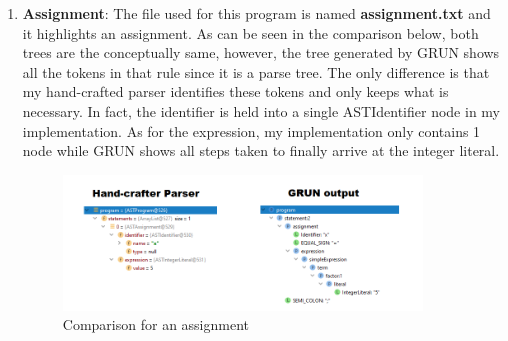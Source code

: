 \documentclass{article}
\begin{document}
\begin{enumerate}
					\item \textbf{Assignment}: The file used for this program is named \textbf{assignment.txt} and it highlights an assignment. As can be seen in the comparison below, both trees are the conceptually same, however, the tree generated by GRUN shows all the tokens in that rule since it is a parse tree. The only difference is that my hand-crafted parser identifies these tokens and only keeps what is necessary.  In fact, the identifier is held into a single ASTIdentifier node in my implementation. As for the expression, my implementation only contains 1 node while GRUN shows all steps taken to finally arrive at the integer literal.
						\begin{figure}[H]
					\centering
			 			\includegraphics[width=0.9\textwidth]{compareassignment.png}
			  			\caption{Comparison for an assignment}
			  			\label{fig:compareassignment}
					\end{figure}
					

\end{enumerate}
\end{document}
